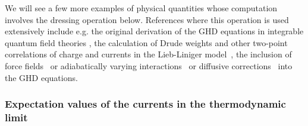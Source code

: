\documentclass[onecolumn,amsfonts,showpacs,superscriptaddress]{revtex4-1}
\begin{document}
We will see a few more examples of physical quantities whose computation involves the dressing operation below. References where this operation is used extensively include e.g. the original derivation of the GHD equations in integrable quantum field theories \citep{castro2016emergent}, the calculation of Drude weights and other two-point correlations of charge and currents in the Lieb-Liniger model~\citep{doyon2017drude}, the inclusion of force fields~\citep{doyon2017note} or adiabatically varying interactions~\citep{bastianello2019generalized} or diffusive corrections~\citep{de2018hydrodynamic,gopalakrishnan2018hydrodynamics,de2019diffusion} into the GHD equations.


\subsubsection{Expectation values of the currents in the thermodynamic limit}
\label{subsec:expectation_thermodynamic}
\end{document}
